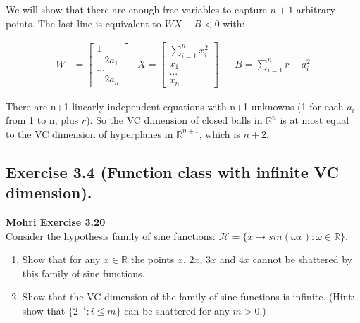 \documentclass[
10pt, %
a4paper, %
oneside, %
headinclude,footinclude, %
BCOR5mm, %
]{scrartcl}
\newenvironment{problem}[2][]
               { \begin{mdframed}[backgroundcolor=gray!20] \textbf{#1 #2} \\}
               {  \end{mdframed}}
\begin{document}
We will show that there are enough free variables to capture $n+1$ arbitrary points. The last line is equivalent to $WX - B < 0$ with:

\begin{align*}
  W &= \begin{bmatrix}
    1 \\
    -2a_1 \\
    ... \\
    -2a_n
   \end{bmatrix} & X = \begin{bmatrix}
     \sum_{i=1}^n x_i^2 \\
     x_1 \\
     ... \\
     x_n
   \end{bmatrix} &&  B = \sum_{i=1}^n r - a_i^2
\end{align*}

There are n+1 linearly independent equations with n+1 unknowns (1 for each $a_i$ from 1 to n, plus $r$). So the VC dimension of closed balls in $\mathbb{R}^n$ is at most equal to the VC dimension of hyperplanes in $\mathbb{R}^{n+1}$, which is $n+2$.
\newpage
\subsection*{Exercise 3.4 (Function class with infinite VC dimension).}
\begin{problem}{Mohri Exercise 3.20}
Consider the hypothesis family of sine functions: $\mathcal{H} = \{x \to sin(\omega x): \omega \in \mathbb{R}\}$.
\begin{enumerate}[label=(\alph*)]
\item Show that for any $x \in \mathbb{R}$ the points $x$, $2x$, $3x$ and $4x$ cannot be shattered by this family of sine functions.
\item Show that the VC-dimension of the family of sine functions is infinite. (Hint: show that $\{2^{-i}: i \leq m\}$ can be shattered for any $m > 0$.)
\end{enumerate}
\end{problem}
\end{document}
